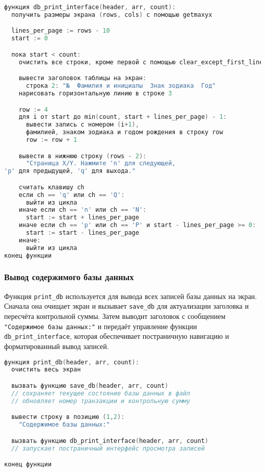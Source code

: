 \begin{lstlisting}[language=C, caption=Функция db\_print\_interface]
функция db_print_interface(header, arr, count):
  получить размеры экрана (rows, cols) с помощью getmaxyx

  lines_per_page := rows - 10
  start := 0

  пока start < count:
    очистить все строки, кроме первой с помощью clear_except_first_line

    вывести заголовок таблицы на экран:
      строка 2: "№  Фамилия и инициалы  Знак зодиака  Год"
    нарисовать горизонтальную линию в строке 3

    row := 4
    для i от start до min(count, start + lines_per_page) - 1:
      вывести запись с номером (i+1), 
      фамилией, знаком зодиака и годом рождения в строку row
      row := row + 1

    вывести в нижнюю строку (rows - 2):
      "Страница X/Y. Нажмите 'n' для следующей, 
'p' для предыдущей, 'q' для выхода."

    считать клавишу ch
    если ch == 'q' или ch == 'Q':
      выйти из цикла
    иначе если ch == 'n' или ch == 'N':
      start := start + lines_per_page
    иначе если ch == 'p' или ch == 'P' и start - lines_per_page >= 0:
      start := start - lines_per_page
    иначе:
      выйти из цикла
конец функции

\end{lstlisting}

\subsubsection*{Вывод содержимого базы данных}

Функция \texttt{print\_db} используется для вывода всех записей базы данных на экран. Сначала она очищает экран и вызывает \texttt{save\_db} для актуализации заголовка и пересчёта контрольной суммы. Затем выводит заголовок с сообщением \texttt{"Содержимое базы данных:"} и передаёт управление функции \texttt{db\_print\_interface}, которая обеспечивает постраничную навигацию и форматированный вывод записей.

\begin{lstlisting}[language=C, caption=Функция print\_db]
функция print_db(header, arr, count):
  очистить весь экран

  вызвать функцию save_db(header, arr, count)
  // сохраняет текущее состояние базы данных в файл
  // обновляет номер транзакции и контрольную сумму

  вывести строку в позицию (1,2):
    "Содержимое базы данных:"

  вызвать функцию db_print_interface(header, arr, count)
  // запускает постраничный интерфейс просмотра записей

конец функции
\end{lstlisting}

